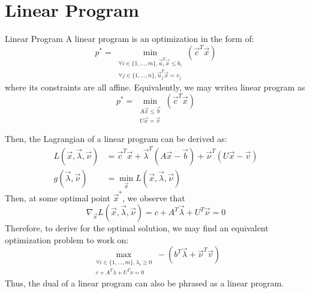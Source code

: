 \section{Linear Program}
\begin{ln-define}{Linear Program}{}
    A linear program is an optimization in the form of:
    \[
        p^* = \min_{
            \substack{
                \forall i \in \{1, \dots, m\}, \vec{a}_i^T \vec{x} \leq b_i \\
                \forall j \in \{1, \dots, n\}, \vec{u}_j^T \vec{x} = v_j
            }
        } (\vec{c}^T \vec{x})
    \]
    where its constraints are all affine.
    Equivalently, we may writea linear program as
    \[
        p^* = \min_{
            \substack{
                A \vec{x} \leq \vec{b} \\
                U \vec{x} = \vec{v}
            }
        } (\vec{c}^T \vec{x})
    \]
\end{ln-define}
Then, the Lagrangian of a linear program can be derived as:
\begin{align*}
    L(\vec{x}, \vec{\lambda}, \vec{\nu}) &= \vec{c}^T \vec{x} + \vec{\lambda}^T (A \vec{x} - \vec{b}) + \vec{\nu}^T (U \vec{x} - \vec{v}) \\
    g(\vec{\lambda}, \vec{\nu}) &= \min_{\vec{x}} L(\vec{x}, \vec{\lambda}, \vec{\nu})
\end{align*}
Then, at some optimal point $\vec{x}^*$, we observe that
\[
    \nabla_{\vec{x}} L(\vec{x}, \vec{\lambda}, \vec{\nu}) = c + A^T \vec{\lambda} + U^T \vec{\nu} = 0
\]
Therefore, to derive for the optimal solution, we may find an equivalent optimization problem to work on:
\[
    \max_{
        \substack{
            \forall i \in \{1, \dots, m\}, \lambda_i \geq 0 \\
            c + A^T \lambda + U^T \nu = 0
        }
    } -(b^T \vec{\lambda} + \vec{\nu}^T \vec{v})
\]
Thus, the dual of a linear program can also be phrased as a linear program.
